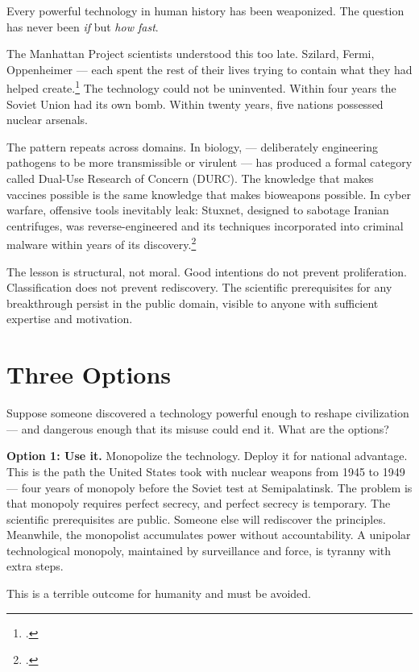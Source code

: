 Every powerful technology in human history has been weaponized. The question has never been \textit{if} but \textit{how fast}.

The Manhattan Project scientists understood this too late. Szilard, Fermi, Oppenheimer --- each spent the rest of their lives trying to contain what they had helped create.\footcite{rhodes1986} The technology could not be uninvented. Within four years the Soviet Union had its own bomb. Within twenty years, five nations possessed nuclear arsenals.

The pattern repeats across domains. In biology,  --- deliberately engineering pathogens to be more transmissible or virulent --- has produced a formal category called Dual-Use Research of Concern (DURC). The knowledge that makes vaccines possible is the same knowledge that makes bioweapons possible. In cyber warfare, offensive tools inevitably leak: Stuxnet, designed to sabotage Iranian centrifuges, was reverse-engineered and its techniques incorporated into criminal malware within years of its discovery.\footcite{zetter2014}

The lesson is structural, not moral. Good intentions do not prevent proliferation. Classification does not prevent rediscovery. The scientific prerequisites for any breakthrough persist in the public domain, visible to anyone with sufficient expertise and motivation.

\section*{Three Options}
\label{spine:wr-three-options}

Suppose someone discovered a technology powerful enough to reshape civilization --- and dangerous enough that its misuse could end it. What are the options?

\textbf{Option 1: Use it.} Monopolize the technology. Deploy it for national advantage. This is the path the United States took with nuclear weapons from 1945 to 1949 --- four years of monopoly before the Soviet test at Semipalatinsk. The problem is that monopoly requires perfect secrecy, and perfect secrecy is temporary. The scientific prerequisites are public. Someone else will rediscover the principles. Meanwhile, the monopolist accumulates power without accountability. A unipolar technological monopoly, maintained by surveillance and force, is tyranny with extra steps.

This is a terrible outcome for humanity and must be avoided.

